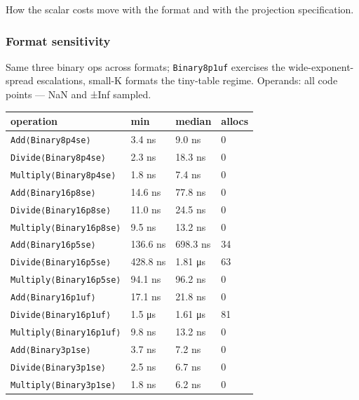 \label{14065249436593140616}{}


How the scalar costs move with the format and with the projection specification.



\subsubsection{Format sensitivity}



\label{18234318524667261557}{}


Same three binary ops across formats; \texttt{Binary8p1uf} exercises the wide-exponent-spread escalations, small-K formats the tiny-table regime. Operands: all code points — NaN and ±Inf sampled.




\begin{table}[h]
\centering
\begin{tabulary}{\linewidth}{L L L L}
\toprule
operation & min & median & allocs \\
\toprule
\texttt{Add⟨Binary8p4se⟩} & 3.4 ns & 9.0 ns & 0 \\
\texttt{Divide⟨Binary8p4se⟩} & 2.3 ns & 18.3 ns & 0 \\
\texttt{Multiply⟨Binary8p4se⟩} & 1.8 ns & 7.4 ns & 0 \\
\texttt{Add⟨Binary16p8se⟩} & 14.6 ns & 77.8 ns & 0 \\
\texttt{Divide⟨Binary16p8se⟩} & 11.0 ns & 24.5 ns & 0 \\
\texttt{Multiply⟨Binary16p8se⟩} & 9.5 ns & 13.2 ns & 0 \\
\texttt{Add⟨Binary16p5se⟩} & 136.6 ns & 698.3 ns & 34 \\
\texttt{Divide⟨Binary16p5se⟩} & 428.8 ns & 1.81 μs & 63 \\
\texttt{Multiply⟨Binary16p5se⟩} & 94.1 ns & 96.2 ns & 0 \\
\texttt{Add⟨Binary16p1uf⟩} & 17.1 ns & 21.8 ns & 0 \\
\texttt{Divide⟨Binary16p1uf⟩} & 1.5 μs & 1.61 μs & 81 \\
\texttt{Multiply⟨Binary16p1uf⟩} & 9.8 ns & 13.2 ns & 0 \\
\texttt{Add⟨Binary3p1se⟩} & 3.7 ns & 7.2 ns & 0 \\
\texttt{Divide⟨Binary3p1se⟩} & 2.5 ns & 6.7 ns & 0 \\
\texttt{Multiply⟨Binary3p1se⟩} & 1.8 ns & 6.2 ns & 0 \\
\bottomrule
\end{tabulary}

\end{table}



